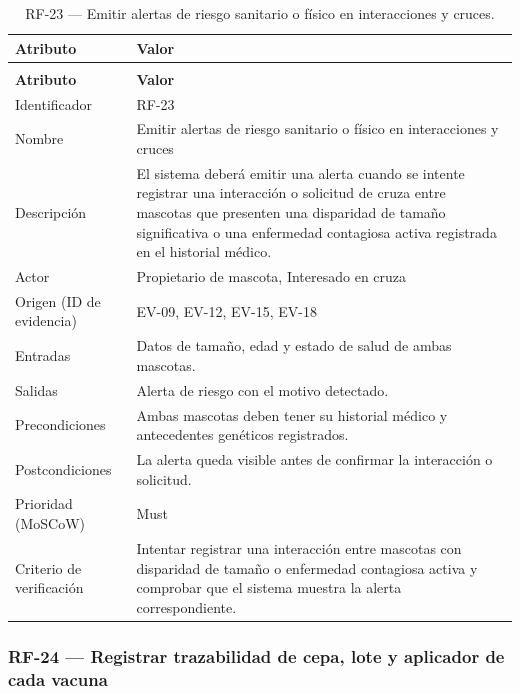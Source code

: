 \documentclass[journal,onecolumn]{IEEEtran}
\makeatletter
\newenvironment{atributos}[2]{%
	\small
	\begin{longtable}{@{}>{\raggedright\arraybackslash}p{4.2cm} >{\raggedright\arraybackslash}p{11.2cm}@{}}
		\caption{#2}\label{tab:#1}\\
		\toprule
		\textbf{Atributo} & \textbf{Valor} \\
		\midrule
		\endfirsthead
		\multicolumn{2}{@{}l}{\small\itshape (continuación)}\\
		\toprule
		\textbf{Atributo} & \textbf{Valor} \\
		\midrule
		\endhead
		\bottomrule
		\endlastfoot
	}{%
	\end{longtable}
	\normalsize
}
\makeatother
\begin{document}
	\begin{atributos}{RF-23}{RF-23 --- Emitir alertas de riesgo sanitario o físico en interacciones y cruces.}
		Identificador & RF-23 \\
		Nombre & Emitir alertas de riesgo sanitario o físico en interacciones y cruces \\
		Descripción & El sistema deberá emitir una alerta cuando se intente registrar una interacción o solicitud de cruza entre mascotas que presenten una disparidad de tamaño significativa o una enfermedad contagiosa activa registrada en el historial médico. \\
		Actor & Propietario de mascota, Interesado en cruza \\
		Origen (ID de evidencia) & EV-09, EV-12, EV-15, EV-18 \\
		Entradas & Datos de tamaño, edad y estado de salud de ambas mascotas. \\
		Salidas & Alerta de riesgo con el motivo detectado. \\
		Precondiciones & Ambas mascotas deben tener su historial médico y antecedentes genéticos registrados. \\
		Postcondiciones & La alerta queda visible antes de confirmar la interacción o solicitud. \\
		Prioridad (MoSCoW) & Must \\
		Criterio de verificación & Intentar registrar una interacción entre mascotas con disparidad de tamaño o enfermedad contagiosa activa y comprobar que el sistema muestra la alerta correspondiente. \\
	\end{atributos}
	
	\subsubsection{RF-24 --- Registrar trazabilidad de cepa, lote y aplicador de cada vacuna}
	
\end{document}

